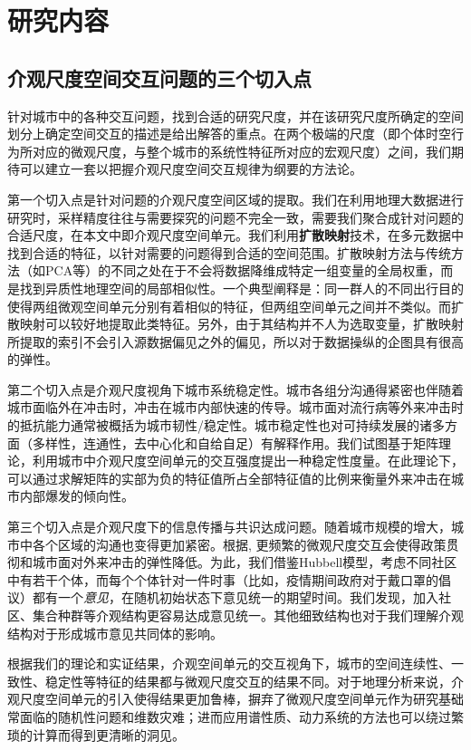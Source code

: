 \chapter{研究内容}

\section{介观尺度空间交互问题的三个切入点}
针对城市中的各种交互问题，找到合适的研究尺度，并在该研究尺度所确定的空间划分上确定空间交互的描述是给出解答的重点。在两个极端的尺度（即个体时空行为所对应的微观尺度，与整个城市的系统性特征所对应的宏观尺度）之间，我们期待可以建立一套以把握介观尺度空间交互规律为纲要的方法论。

第一个切入点是针对问题的介观尺度空间区域的提取。我们在利用地理大数据进行研究时，采样精度往往与需要探究的问题不完全一致，需要我们聚合成针对问题的合适尺度，在本文中即介观尺度空间单元。我们利用\textbf{扩散映射}技术，在多元数据中找到合适的特征，以针对需要的问题得到合适的空间范围。扩散映射方法与传统方法（如PCA等）的不同之处在于不会将数据降维成特定一组变量的全局权重，而是找到异质性地理空间的局部相似性。一个典型阐释是：同一群人的不同出行目的使得两组微观空间单元分别有着相似的特征，但两组空间单元之间并不类似。而扩散映射可以较好地提取此类特征。另外，由于其结构并不人为选取变量，扩散映射所提取的索引不会引入源数据偏见之外的偏见，所以对于数据操纵的企图具有很高的弹性。

第二个切入点是介观尺度视角下城市系统稳定性。城市各组分沟通得紧密也伴随着城市面临外在冲击时，冲击在城市内部快速的传导。城市面对流行病等外来冲击时的抵抗能力通常被概括为城市韧性/稳定性。城市稳定性也对可持续发展的诸多方面（多样性，连通性，去中心化和自给自足）有解释作用。我们试图基于矩阵理论，利用城市中介观尺度空间单元的交互强度提出一种稳定性度量。在此理论下，可以通过求解矩阵的实部为负的特征值所占全部特征值的比例来衡量外来冲击在城市内部爆发的倾向性。

第三个切入点是介观尺度下的信息传播与共识达成问题。随着城市规模的增大，城市中各个区域的沟通也变得更加紧密。根据\cite{stark2008decelerating}, 更频繁的微观尺度交互会使得政策贯彻和城市面对外来冲击的弹性降低。为此，我们借鉴Hubbell模型\cite{hubbell2011unified}，考虑不同社区中有若干个体，而每个个体针对一件时事（比如，疫情期间政府对于戴口罩的倡议）都有一个\textit{意见}，在随机初始状态下意见统一的期望时间。我们发现，加入社区、集合种群等介观结构更容易达成意见统一。其他细致结构也对于我们理解介观结构对于形成城市意见共同体的影响。

根据我们的理论和实证结果，介观空间单元的交互视角下，城市的空间连续性、一致性、稳定性等特征的结果都与微观尺度交互的结果不同。对于地理分析来说，介观尺度空间单元的引入使得结果更加鲁棒，摒弃了微观尺度空间单元作为研究基础常面临的随机性问题和维数灾难；进而应用谱性质、动力系统的方法也可以绕过繁琐的计算而得到更清晰的洞见。
